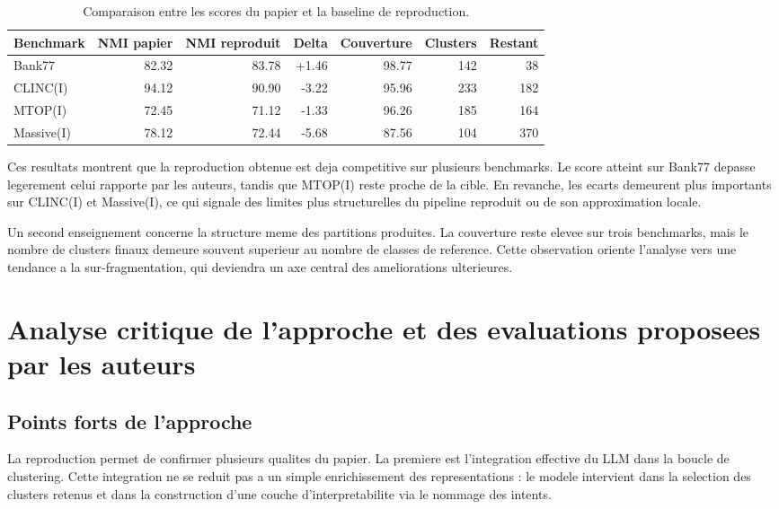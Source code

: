 \begin{table}[h]
  \centering
  \small
  \begin{tabular}{lrrrrrr}
    \toprule
    Benchmark & NMI papier & NMI reproduit & Delta & Couverture & Clusters & Restant \\
    \midrule
    Bank77 & 82.32 & 83.78 & +1.46 & 98.77 & 142 & 38 \\
    CLINC(I) & 94.12 & 90.90 & -3.22 & 95.96 & 233 & 182 \\
    MTOP(I) & 72.45 & 71.12 & -1.33 & 96.26 & 185 & 164 \\
    Massive(I) & 78.12 & 72.44 & -5.68 & 87.56 & 104 & 370 \\
    \bottomrule
  \end{tabular}
  \caption{Comparaison entre les scores du papier et la baseline de reproduction.}
  \label{tab:reproduction-results}
\end{table}

Ces resultats montrent que la reproduction obtenue est deja competitive sur
plusieurs benchmarks. Le score atteint sur Bank77 depasse legerement celui
rapporte par les auteurs, tandis que MTOP(I) reste proche de la cible. En
revanche, les ecarts demeurent plus importants sur CLINC(I) et Massive(I), ce
qui signale des limites plus structurelles du pipeline reproduit ou de son
approximation locale.

Un second enseignement concerne la structure meme des partitions produites. La
couverture reste elevee sur trois benchmarks, mais le nombre de clusters finaux
demeure souvent superieur au nombre de classes de reference. Cette observation
oriente l'analyse vers une tendance a la sur-fragmentation, qui deviendra un
axe central des ameliorations ulterieures.

\section{Analyse critique de l'approche et des evaluations proposees par les auteurs}

\subsection{Points forts de l'approche}

La reproduction permet de confirmer plusieurs qualites du papier. La premiere
est l'integration effective du LLM dans la boucle de clustering. Cette
integration ne se reduit pas a un simple enrichissement des representations :
le modele intervient dans la selection des clusters retenus et dans la
construction d'une couche d'interpretabilite via le nommage des intents.

